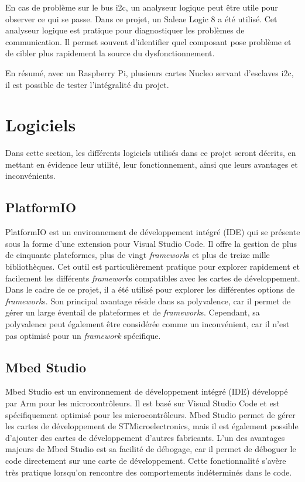En cas de problème sur le bus \gls{i2c}, un analyseur logique peut être utile pour observer ce qui se passe.
Dans ce projet, un Saleae Logic 8 a été utilisé.
Cet analyseur logique est pratique pour diagnostiquer les problèmes de communication.
Il permet souvent d'identifier quel composant pose problème et de cibler plus rapidement la source du dysfonctionnement.

En résumé, avec un Raspberry Pi, plusieurs cartes Nucleo servant d'esclaves \gls{i2c}, il est possible de tester l'intégralité du projet.

\section{Logiciels}

Dans cette section, les différents logiciels utilisés dans ce projet seront décrits, en mettant en évidence leur utilité, leur fonctionnement, ainsi que leurs avantages et inconvénients.

\subsection{PlatformIO}

PlatformIO est un environnement de développement intégré (IDE) qui se présente sous la forme d'une extension pour Visual Studio Code.
Il offre la gestion de plus de cinquante plateformes, plus de vingt \textit{\gls{framework}}s et plus de treize mille bibliothèques.
Cet outil est particulièrement pratique pour explorer rapidement et facilement les différents \textit{\gls{framework}}s compatibles avec les cartes de développement.
Dans le cadre de ce projet, il a été utilisé pour explorer les différentes options de \textit{\gls{framework}}s.
Son principal avantage réside dans sa polyvalence, car il permet de gérer un large éventail de plateformes et de \textit{\gls{framework}}s.
Cependant, sa polyvalence peut également être considérée comme un inconvénient, car il n'est pas optimisé pour un \textit{\gls{framework}} spécifique.

\subsection{Mbed Studio}

Mbed Studio est un environnement de développement intégré (IDE) développé par Arm pour les microcontrôleurs.
Il est basé sur Visual Studio Code et est spécifiquement optimisé pour les microcontrôleurs.
Mbed Studio permet de gérer les cartes de développement de STMicroelectronics, mais il est également possible d'ajouter des cartes de développement d'autres fabricants.
L'un des avantages majeurs de Mbed Studio est sa facilité de débogage, car il permet de déboguer le code directement sur une carte de développement.
Cette fonctionnalité s'avère très pratique lorsqu'on rencontre des comportements indéterminés dans le code.

